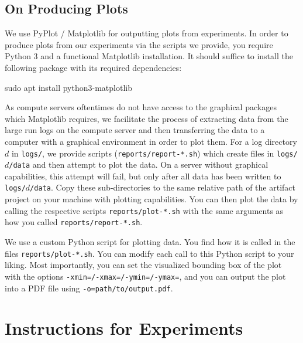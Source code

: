 \documentclass[runningheads]{article}
\numberwithin{dummy}{subsection}
\begin{document}
\subsection{On Producing Plots}
\label{sec:plots}

We use PyPlot / Matplotlib for outputting plots from experiments.
In order to produce plots from our experiments via the scripts we provide, you require Python 3 and a functional Matplotlib installation.
It should suffice to install the following package with its required dependencies:

\begin{ttfenv}
sudo apt install python3-matplotlib
\end{ttfenv}

As compute servers oftentimes do not have access to the graphical packages which Matplotlib requires, we facilitate the process of extracting data from the large run logs on the compute server and then transferring the data to a computer with a graphical environment in order to plot them.
For a log directory $d$ in \texttt{logs/}, we provide scripts (\texttt{reports/report-*.sh}) which create files in \texttt{logs/$d$/data} and then attempt to plot the data.
On a server without graphical capabilities, this attempt will fail, but only after all data has been written to \texttt{logs/$d$/data}.
Copy these sub-directories to the same relative path of the artifact project on your machine with plotting capabilities.
You can then plot the data by calling the respective scripts \texttt{reports/plot-*.sh} with the same arguments as how you called \texttt{reports/report-*.sh}.

We use a custom Python script for plotting data.
You find how it is called in the files \texttt{reports/plot-*.sh}.
You can modify each call to this Python script to your liking.
Most importantly, you can set the visualized bounding box of the plot with the options \texttt{-xmin=/-xmax=/-ymin=/-ymax=}, and you can output the plot into a PDF file using \texttt{-o=path/to/output.pdf}.














\section{Instructions for Experiments}
\end{document}
